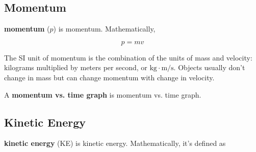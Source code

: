 \documentclass[dvipsnames]{article}
\begin{document}
\clearpage

\subsection{Momentum}


\textbf{\Gls{momentum}} ($p$) is \glsdesc{momentum}. Mathematically, 

\begin{equation*}
    p = mv
\end{equation*}

The SI unit of momentum is the combination of the units of mass and velocity: kilograms multiplied by meters per second, or $\mathrm{kg\cdot m/s}$. Objects usually don't change in mass but can change momentum with change in velocity. 


A \textbf{\gls{momentum vs. time graph}} is \glsdesc{momentum vs. time graph}.

\begin{center}
\end{center}

\subsection{Kinetic Energy}





\textbf{\Gls{kinetic energy}} (KE) is \glsdesc{kinetic energy}. Mathematically, it's defined as
\end{document}
